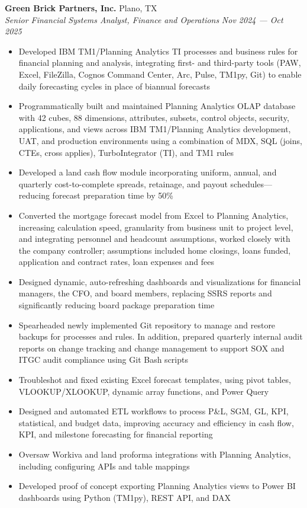 \documentclass[a4paper,11pt]{article}
\begin{document}
\vspace{1mm}
\textbf{Green Brick Partners, Inc.} \hfill Plano, TX \\
\textit{Senior Financial Systems Analyst, Finance and Operations} \hfill \textit{Nov 2024 --- Oct 2025} 
\begin{itemize}
    \item Developed IBM TM1/Planning Analytics TI processes and business rules for financial planning and analysis, integrating first- and third-party tools (PAW, Excel, FileZilla, Cognos Command Center, Arc, Pulse, TM1py, Git) to enable daily forecasting cycles in place of biannual forecasts  
    \item Programmatically built and maintained Planning Analytics OLAP database with 42 cubes, 88 dimensions, attributes, subsets, control objects, security, applications, and views across IBM TM1/Planning Analytics development, UAT, and production environments using a combination of MDX, SQL (joins, CTEs, cross applies), TurboIntegrator (TI), and TM1 rules  
    \item Developed a land cash flow module incorporating uniform, annual, and quarterly cost-to-complete spreads, retainage, and payout schedules—reducing forecast preparation time by 50\%
    \item Converted the mortgage forecast model from Excel to Planning Analytics, increasing calculation speed, granularity from business unit to project level, and integrating personnel and headcount assumptions, worked closely with the company controller; assumptions included home closings, loans funded, application and contract rates, loan expenses and fees
    \item Designed dynamic, auto-refreshing dashboards and visualizations for financial managers, the CFO, and board members, replacing SSRS reports and significantly reducing board package preparation time
    \item Spearheaded newly implemented Git repository to manage and restore backups for processes and rules. In addition, prepared quarterly internal audit reports on change tracking and change management to support SOX and ITGC audit compliance using Git Bash scripts
    \item Troubleshot and fixed existing Excel forecast templates, using pivot tables, VLOOKUP/XLOOKUP, dynamic array functions, and Power Query
    \item Designed and automated ETL workflows to process P\&L, SGM, GL, KPI, statistical, and budget data, improving accuracy and efficiency in cash flow, KPI, and milestone forecasting for financial reporting  
    \item Oversaw Workiva and land proforma integrations with Planning Analytics, including configuring APIs and table mappings
    \item Developed proof of concept exporting Planning Analytics views to Power BI dashboards using Python (TM1py), REST API, and DAX
\end{itemize}
\vspace{1mm}
\end{document}
